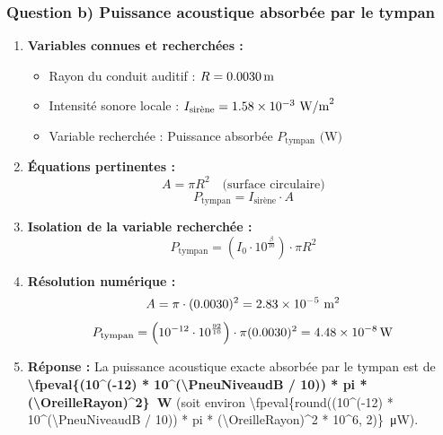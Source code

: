 \subsubsection*{Question b) Puissance acoustique absorbée par le tympan}

\begin{enumerate}[label=\arabic*)]
    \item \textbf{Variables connues et recherchées :}
    \begin{itemize}[label= -]
        \item Rayon du conduit auditif : $R = \qty{0.0030}{m}$
        \item Intensité sonore locale : $I_{\text{sirène}} = \num[scientific-notation=true, round-mode=figures, round-precision=3]{\fpeval{10^(-12) * 10^(\PneuNiveaudB / 10)}} \text{ W/m}^2$
        \item Variable recherchée : Puissance absorbée $P_{\text{tympan}} \text{ (W)}$
    \end{itemize}

    \item \textbf{Équations pertinentes :}
    \[
    A = \pi R^2 \quad \text{(surface circulaire)}
    \]
    \[
    P_{\text{tympan}} = I_{\text{sirène}} \cdot A
    \]

    \item \textbf{Isolation de la variable recherchée :}
    \[
    P_{\text{tympan}} = \left( I_0 \cdot 10^{\frac{\beta}{10}} \right) \cdot \pi R^2
    \]

    \item \textbf{Résolution numérique :}
    \[
    A = \pi \cdot (\OreilleRayon)^2 = \num[scientific-notation=true, round-mode=figures, round-precision=3]{\fpeval{pi * (\OreilleRayon)^2}} \text{ m}^2
    \]
    \[
    P_{\text{tympan}} = \left(10^{-12} \cdot 10^{\frac{\PneuNiveaudB}{10}}\right) \cdot \pi (\OreilleRayon)^2 = \qty[scientific-notation=true, round-mode=figures, round-precision=3]{\fpeval{(10^(-12) * 10^(\PneuNiveaudB / 10)) * pi * (\OreilleRayon)^2}}{W}
    \]

    \item \textbf{Réponse :}
    La puissance acoustique exacte absorbée par le tympan est de \textbf{\qty[scientific-notation=true, round-mode=figures, round-precision=3]{\fpeval{(10^(-12) * 10^(\PneuNiveaudB / 10)) * pi * (\OreilleRayon)^2}}{W}} (soit environ \qty{\fpeval{round((10^(-12) * 10^(\PneuNiveaudB / 10)) * pi * (\OreilleRayon)^2 * 10^6, 2)}}{\micro\watt}).
\end{enumerate}


